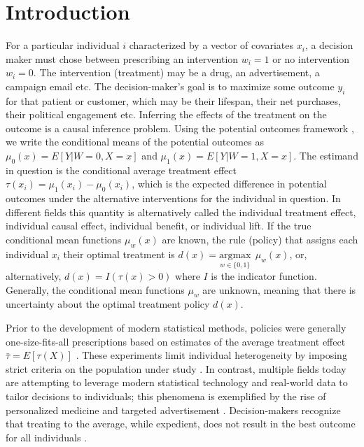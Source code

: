 \section{Introduction}

For a particular individual $i$ characterized by a vector of covariates $x_i$, a decision maker must chose between prescribing an intervention $w_i=1$ or no intervention $w_i=0$. The intervention (treatment) may be a drug, an advertisement, a campaign email etc. The decision-maker's goal is to maximize some outcome $y_i$ for that patient or customer, which may be their lifespan, their net purchases, their political engagement etc. Inferring the effects of the treatment on the outcome is a causal inference problem. Using the potential outcomes framework \cite{Rubin2005}, we write the conditional means of the potential outcomes as $\mu_0(x) = E[Y|W=0,X=x]$ and $\mu_1(x) = E[Y|W=1,X=x]$. The estimand in question is the conditional average treatment effect $\tau(x_i) = \mu_1(x_i) - \mu_0(x_i)$, which is the expected difference in potential outcomes under the alternative interventions for the individual in question. In different fields this quantity is alternatively called the individual treatment effect, individual causal effect, individual benefit, or individual lift. If the true conditional mean functions $\mu_w(x)$ are known, the rule (policy) that assigns each individual $x_i$ their optimal treatment is $d(x) = \underset{w \in \{0,1\}}{\text{argmax}} \ \ \mu_w(x)$, or, alternatively, $d(x) = I(\tau(x) > 0)$ where $I$ is the indicator function. Generally, the conditional mean functions $\mu_w$ are unknown, meaning that there is uncertainty about the optimal treatment policy $d(x)$.

Prior to the development of modern statistical methods, policies were generally one-size-fits-all prescriptions based on estimates of the average treatment effect $\bar\tau = E[\tau(X)]$ \cite{Segal:ub}. These experiments limit individual heterogeneity by imposing strict criteria on the population under study \cite{?_INCLUSION_CRITERIA}. In contrast, multiple fields today are attempting to leverage modern statistical technology and real-world data to tailor decisions to individuals; this phenomena is exemplified by the rise of personalized medicine \cite{Ferreira:2017fv} and targeted advertisement \cite{Ascarza:2018ie, ?_POLITICAL_TARGETING}. Decision-makers recognize that treating to the average, while expedient, does not result in the best outcome for all individuals \cite{Kravitz:2004fa,Segal:ub}. 

